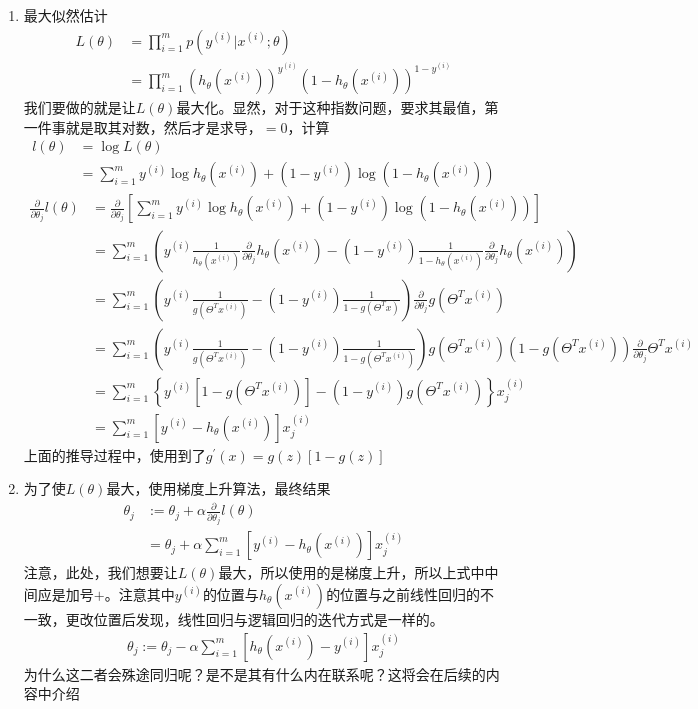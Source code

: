 \begin{enumerate}
\begin{enumerate}
\begin{enumerate}
			\item 最大似然估计
			\begin{align}
				L(\theta) &= \prod_{i=1}^{m}p(y^{(i)}|x^{(i)}; \theta) \\
				&= \prod_{i=1}^{m}\left( h_\theta(x^{(i)}) \right)^{y^{(i)}} \left( 1-h_\theta(x^{(i)}) \right)^{1-y^{(i)}}
			\end{align}
			我们要做的就是让$L(\theta)$最大化。显然，对于这种指数问题，要求其最值，第一件事就是取其对数，然后才是求导，$=0$，计算
			\begin{align}
				l(\theta) &= \log L(\theta) \\
				&= \sum_{i=1}^{m}y^{(i)}\log h_\theta(x^{(i)}) + (1-y^{(i)})\log(1-h_\theta(x^{(i)}))
			\end{align}
			\begin{align}
				\frac{\partial}{\partial \theta_j}l(\theta) &= \frac{\partial}{\partial \theta_j} \left[ \sum_{i=1}^{m}y^{(i)}\log h_\theta(x^{(i)}) + (1-y^{(i)})\log(1-h_\theta(x^{(i)})) \right]\\
				&= \sum_{i=1}^{m} \left( y^{(i)}\frac{1}{h_\theta(x^{(i)})} \frac{\partial}{\partial\theta_j}h_\theta(x^{(i)}) - (1-y^{(i)})\frac{1}{1-h_\theta(x^{(i)})}\frac{\partial}{\partial\theta_j}h_\theta(x^{(i)})  \right) \\
				&= \sum_{i=1}^{m} \left( y^{(i)}\frac{1}{g(\Theta^Tx^{(i)})} - (1-y^{(i)})\frac{1}{1-g(\Theta^Tx)} \right) \frac{\partial}{\partial\theta_j}g(\Theta^Tx^{(i)}) \\
				&= \sum_{i=1}^{m} \left( y^{(i)}\frac{1}{g(\Theta^Tx^{(i)})} - (1-y^{(i)})\frac{1}{1-g(\Theta^Tx^{(i)})} \right)g(\Theta^Tx^{(i)})(1-g(\Theta^Tx^{(i)})) \frac{\partial}{\partial\theta_j}\Theta^Tx^{(i)} \\
				&= \sum_{i=1}^{m} \left\{ y^{(i)}\left[1-g(\Theta^Tx^{(i)})\right] - (1-y^{(i)})g(\Theta^Tx^{(i)}) \right\}x_j^{(i)} \\
				&= \sum_{i=1}^{m} \left[ y^{(i)} - h_\theta(x^{(i)}) \right]x_j^{(i)}
			\end{align}
			上面的推导过程中，使用到了$g^{'}{(x)}=g(z)\left[1-g(z)\right]$

			\item 为了使$L(\theta)$最大，使用梯度上升算法，最终结果
			\begin{align}
				\theta_j &:= \theta_j + \alpha \frac{\partial}{\partial \theta_j}l(\theta) \\
				&=  \theta_j + \alpha \sum_{i=1}^{m} \left[ y^{(i)} - h_\theta(x^{(i)}) \right]x_j^{(i)}
			\end{align}
			注意，此处，我们想要让$L(\theta)$最大，所以使用的是梯度上升，所以上式中中间应是加号$+$。注意其中$y^{(i)}$的位置与$h_\theta(x^{(i)})$的位置与之前线性回归的不一致，更改位置后发现，线性回归与逻辑回归的迭代方式是一样的。
			\begin{align}
				\theta_j :=  \theta_j - \alpha \sum_{i=1}^{m} \left[h_\theta(x^{(i)}) - y^{(i)} \right]x_j^{(i)}
			\end{align}
			为什么这二者会殊途同归呢？是不是其有什么内在联系呢？这将会在后续的内容中介绍


\end{enumerate}
\end{enumerate}
\end{enumerate}
